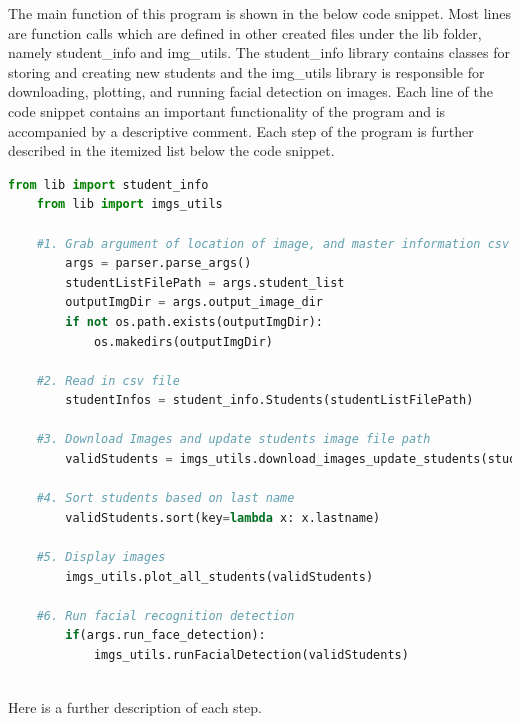 \documentclass[12pt, letterpaper, final, onecolumn, titlepage] {article}
\begin{document}
The main function of this program is shown in the below code snippet. Most lines are function calls which are defined in other created files under the lib folder, namely student\_info and img\_utils. The student\_info library contains classes for storing and creating new students and the img\_utils library is responsible for downloading, plotting, and running facial detection on images. Each line of the code snippet contains an important functionality of the program and is accompanied by a descriptive comment. Each step of the program is further described in the itemized list below the code snippet.

\singlespacing
\begin{lstlisting}[language=Python]
	from lib import student_info
	from lib import imgs_utils
	
	#1. Grab argument of location of image, and master information csv
		args = parser.parse_args()
		studentListFilePath = args.student_list
		outputImgDir = args.output_image_dir
		if not os.path.exists(outputImgDir):
			os.makedirs(outputImgDir)

	#2. Read in csv file
		studentInfos = student_info.Students(studentListFilePath)

	#3. Download Images and update students image file path
		validStudents = imgs_utils.download_images_update_students(studentInfos, outputImgDir)

	#4. Sort students based on last name
		validStudents.sort(key=lambda x: x.lastname)

	#5. Display images
		imgs_utils.plot_all_students(validStudents)

	#6. Run facial recognition detection
		if(args.run_face_detection):
			imgs_utils.runFacialDetection(validStudents)
	
\end{lstlisting}
\doublespacing
Here is a further description of each step.
\end{document}
